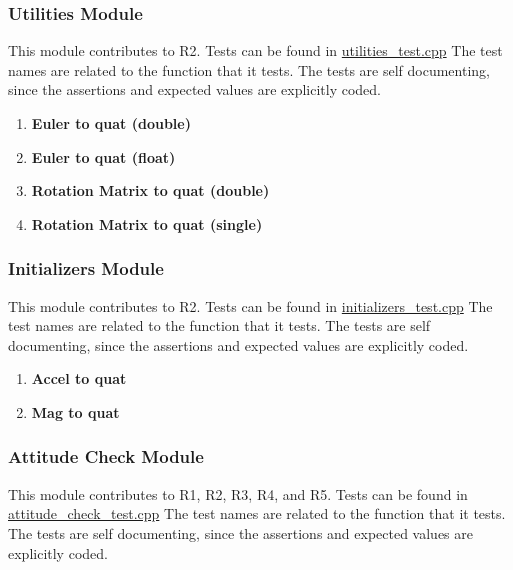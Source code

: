 \documentclass[12pt, titlepage]{article}
\newcommand{\UTthetestnum}{UT\theutestnum}
\begin{document}
\subsubsection{Utilities Module}

This module contributes to R2. Tests can be found in
\href{https://github.com/adrian-soch/attitude_check/blob/main/test/utilities_test.cpp}{utilities\_test.cpp}
The test names are related to the function that it tests. The tests are self documenting, since the
assertions and expected values are explicitly coded.

\begin{enumerate}
  \item[\refstepcounter{utestnum} \UTthetestnum:] \textbf{Euler to quat (double)}
  \item[\refstepcounter{utestnum} \UTthetestnum:] \textbf{Euler to quat (float)}
  \item[\refstepcounter{utestnum} \UTthetestnum:] \textbf{Rotation Matrix to quat (double)}
  \item[\refstepcounter{utestnum} \UTthetestnum:] \textbf{Rotation Matrix to quat (single)}
\end{enumerate}

\subsubsection{Initializers Module}

This module contributes to R2. Tests can be found in
\href{https://github.com/adrian-soch/attitude_check/blob/main/test/initializers_test.cpp}{initializers\_test.cpp}
The test names are related to the function that it tests. The tests are self documenting, since the
assertions and expected values are explicitly coded.

\begin{enumerate}
  \item[\refstepcounter{utestnum} \UTthetestnum:] \textbf{Accel to quat}
  \item[\refstepcounter{utestnum} \UTthetestnum:] \textbf{Mag to quat}
\end{enumerate}

\subsubsection{Attitude Check Module}

This module contributes to R1, R2, R3, R4, and R5. Tests can be found in
\href{https://github.com/adrian-soch/attitude_check/blob/main/test/attitude_check_test.cpp}{attitude\_check\_test.cpp}
The test names are related to the function that it tests. The tests are self documenting, since the
assertions and expected values are explicitly coded.
\end{document}
